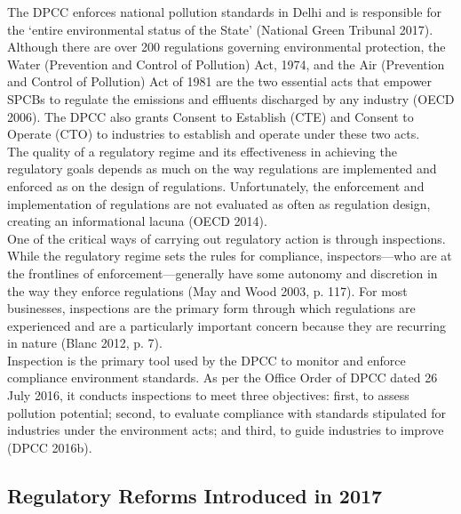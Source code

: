 \documentclass[a4paper, 12pt]{article}
\begin{document}
                 The DPCC enforces national pollution standards in Delhi and is responsible for the ‘entire environmental status of the State’ (National Green Tribunal 2017). \\
                 
                 Although there are over 200 regulations governing environmental protection, the Water (Prevention and Control of Pollution) Act, 1974, and the Air (Prevention and Control of Pollution) Act of 1981 are the two essential acts that empower SPCBs to regulate the emissions and effluents discharged by any industry (OECD 2006). The DPCC also grants Consent to Establish (CTE) and Consent to Operate (CTO) to industries to establish and operate under these two acts. \\
                 
                 The quality of a regulatory regime and its effectiveness in achieving the regulatory goals depends as much on the way regulations are implemented and enforced as on the design of regulations. Unfortunately, the enforcement and implementation of regulations are not evaluated as often as regulation design, creating an informational lacuna (OECD 2014). \\
                 
                 One of the critical ways of carrying out regulatory action is through inspections. While the regulatory regime sets the rules for compliance, inspectors—who are at the frontlines of enforcement—generally have some autonomy and discretion in the way they enforce regulations (May and Wood 2003, p. 117). For most businesses, inspections are the primary form through which regulations are experienced and are a particularly important concern because they are recurring in nature (Blanc 2012, p. 7). \\
                 
                 Inspection is the primary tool used by the DPCC to monitor and enforce compliance environment standards. As per the Office Order of DPCC dated 26 July 2016, it conducts inspections to meet three objectives: first, to assess pollution potential; second, to evaluate compliance with standards stipulated for industries under the environment acts; and third, to guide industries to improve (DPCC 2016b). \\
                 
                 \subsection{Regulatory Reforms Introduced in 2017}
                 
\end{document}
